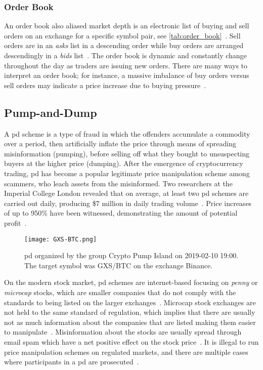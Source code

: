 \subsubsection{Order Book}
An order book also aliased market depth is an electronic list of buying and sell orders on an exchange for a specific symbol pair, see \autoref{tab:order_book}~\cite{investopedia_depth}. Sell orders are in an \emph{asks} list in a descending order while buy orders are arranged descendingly in a \emph{bids} list~\cite{invest_order_book, coincodex_order_book}. The order book is dynamic and constantly change throughout the day as traders are issuing new orders. There are many ways to interpret an order book; for instance, a massive imbalance of buy orders versus sell orders may indicate a price increase due to buying pressure~\cite{invest_order_book}.


\subsection{Pump-and-Dump}\label{sec:pd}
A \ac{pd} scheme is a type of fraud in which the offenders accumulate a commodity over a period, then artificially inflate the price through means of spreading misinformation (pumping), before selling off what they bought to unsuspecting buyers at the higher price (dumping)\cite{P&D_to_the_moon}. After the emergence of cryptocurrency trading, \ac{pd} has become a popular legitimate price manipulation scheme among scammers, who leach assets from the misinformed. Two researchers at the Imperial College London revealed that on average, at least two \ac{pd} schemes are carried out daily, producing \$$7$ million in daily trading volume~\cite{P&D_MIT_crypto}. Price increases of up to 950\% have been witnessed, demonstrating the amount of potential profit~\cite{P&D_cointelegraph}.

\begin{figure}[ht]
    \texttt{[image: GXS-BTC.png]}
    \centering
    \caption{\ac{pd} organized by the group Crypto Pump Island on 2019-02-10 19:00. The target symbol was GXS/BTC on the exchange Binance.}
    \label{fig:pd-gxsbtc}
\end{figure}

On the modern stock market, \ac{pd} schemes are internet-based focusing on \emph{penny} or \emph{microcap} stocks, which are smaller companies that do not comply with the standards to being listed on the larger exchanges~\cite{stock_bouraoui, stock_temple, P&D_anatomy}. Microcap stock exchanges are not held to the same standard of regulation, which implies that there are usually not as much information about the companies that are listed making them easier to manipulate~\cite{P&D_to_the_moon}. Misinformation about the stocks are usually spread through email spam which have a net positive effect on the stock price~\cite{stock_bouraoui}. It is illegal to run price manipulation schemes on regulated markets, and there are multiple cases where participants in a \ac{pd} are prosecuted~\cite{P&D_to_the_moon}.

